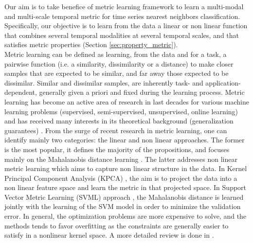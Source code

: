 Our aim is to take benefice of metric learning framework \cite{Weinberger2009a,Bellet2012} to learn a multi-modal and multi-scale temporal metric for time series nearest neighbors classification. Specifically, our objective is to learn from the data a linear or non linear function that combines several temporal modalities at several temporal scales, and that satisfies metric properties (Section \ref{sec:property_metric}). \\
Metric learning can be defined as learning, from the data and for a task, a pairwise function (i.e. a similarity, dissimilarity or a distance) to make closer samples that are expected to be similar, and far away those expected to be dissimilar. Similar and dissimilar samples, are inherently task- and application-dependent, generally given a priori and fixed during the learning process. Metric learning has become an active area of research in last decades for various machine learning problems (supervised, semi-supervised, unsupervised, online learning) and has received many interests in its theoretical background (generalization guarantees) \cite{Bellet2013a}. From the surge of recent research in metric learning, one can identify mainly two categories: the linear and non linear approaches. The former is the most popular, it defines the majority of the propositions, and focuses mainly on the Mahalanobis distance learning \cite{Weinberger2009}. The latter addresses non linear metric learning which aims to capture non linear structure in the data. In Kernel Principal Component Analysis (KPCA) \cite{Zhang2010,Chatpatanasiri2010}, the aim is to project the data into a non linear feature space and learn the metric in that projected space. In Support Vector Metric Learning (SVML) approach \cite{Xu2012}, the Mahalanobis distance is learned jointly with the learning of the SVM model in order to minimize the validation error. In general, the optimization problems are more expensive to solve, and the methods tends to favor overfitting as the constraints are generally easier to satisfy in a nonlinear kernel space. A more detailed review is done in \cite{Bellet2013a}.\\
